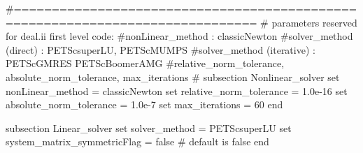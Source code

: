 \begin{DoxyCode}
                    
\textcolor{preprocessor}{#==============================================================================}
\textcolor{preprocessor}{# parameters reserved for deal.ii first level code:}
\textcolor{preprocessor}{#nonLinear\_method : classicNewton}
\textcolor{preprocessor}{#solver\_method (direct) : PETScsuperLU, PETScMUMPS}
\textcolor{preprocessor}{#solver\_method (iterative) : PETScGMRES PETScBoomerAMG}
\textcolor{preprocessor}{#relative\_norm\_tolerance, absolute\_norm\_tolerance, max\_iterations}
\textcolor{preprocessor}{#}
subsection Nonlinear\_solver
        \textcolor{keyword}{set} nonLinear\_method = classicNewton
        \textcolor{keyword}{set} relative\_norm\_tolerance = 1.0e-16
        \textcolor{keyword}{set} absolute\_norm\_tolerance = 1.0e-7
        \textcolor{keyword}{set} max\_iterations = 60
end
                        
subsection Linear\_solver
        \textcolor{keyword}{set} solver\_method = PETScsuperLU
        \textcolor{keyword}{set} system\_matrix\_symmetricFlag = \textcolor{keyword}{false} # \textcolor{keywordflow}{default} is \textcolor{keyword}{false}
end
\end{DoxyCode}
  

 

  